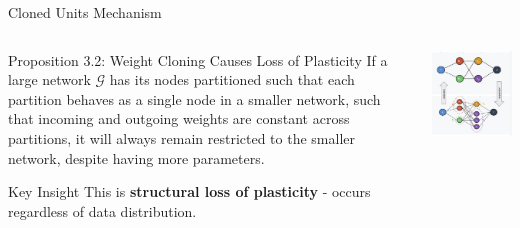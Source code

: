 \documentclass{beamer}
\begin{document}
\begin{frame}{Cloned Units Mechanism}
    \begin{columns}
        \begin{column}{0.5\textwidth}
            \begin{block}{Proposition 3.2: Weight Cloning Causes Loss of Plasticity}
                If a large network $\mathcal{G}$ has its nodes partitioned such that each partition behaves as a single node in a smaller network, such that incoming and outgoing weights are constant across partitions, it will always remain restricted to the smaller network, despite having more parameters.  
            \end{block}
            
            \begin{alertblock}{Key Insight}
                This is \textbf{structural loss of plasticity} - occurs regardless of data distribution. 
            \end{alertblock}
        \end{column}

        \begin{column}{0.5\textwidth}
            \includegraphics[width=\textwidth]{images/covering.png}
        \end{column}
    \end{columns}
\end{frame}
\end{document}

